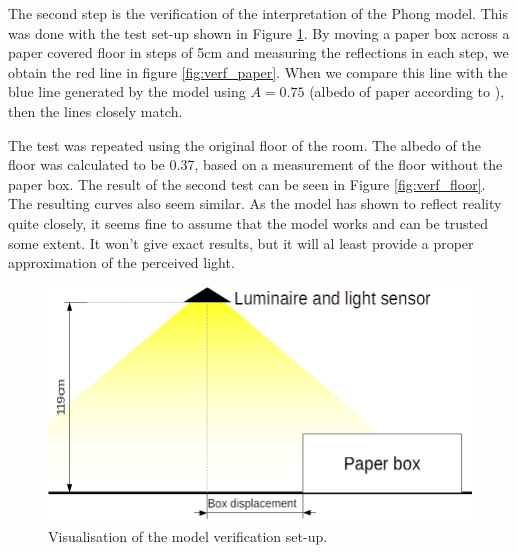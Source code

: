 The second step is the verification of the interpretation of the Phong model. This was done with the test set-up shown in Figure \ref{fig:VerificationSetup}. By moving a paper box across a paper covered floor in steps of 5cm and measuring the reflections in each step, we obtain the red line in figure \ref{fig:verf_paper}. When we compare this line with the blue line generated by the model using $A = 0.75$ (albedo of paper according to \cite{Albedo}), then the lines closely match.

The test was repeated using the original floor of the room. The albedo of the floor was calculated to be 0.37, based on a measurement of the floor without the paper box. The result of the second test can be seen in Figure \ref{fig:verf_floor}. The resulting curves also seem similar. As the model has shown to reflect reality quite closely, it seems fine to assume that the model works and can be trusted some extent. It won't give exact results, but it will al least provide a proper approximation of the perceived light.

\begin{figure}[]
	\centering
	\includegraphics[width=\textwidth]{pics/Verification_Situation.png}
	\caption{Visualisation of the model verification set-up.\label{fig:VerificationSetup}}
\end{figure}


